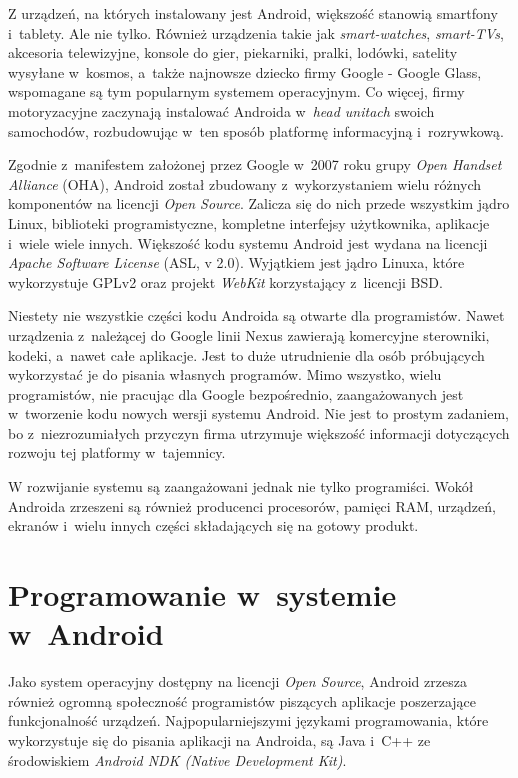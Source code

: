 Z urządzeń, na których instalowany jest Android, większość stanowią smartfony i~tablety. Ale nie tylko. Również urządzenia takie jak \textit{smart-watches}, \textit{smart-TVs}, akcesoria telewizyjne, konsole do gier, piekarniki, pralki, lodówki, satelity wysyłane w~kosmos, a~także najnowsze dziecko firmy Google - Google Glass, wspomagane są tym popularnym systemem operacyjnym. Co więcej, firmy motoryzacyjne zaczynają instalować Androida w~\textit{head unitach} swoich samochodów, rozbudowując w~ten sposób platformę informacyjną i~rozrywkową.

Zgodnie z~manifestem założonej przez Google w~2007 roku grupy \textit{Open Handset Alliance} (OHA), Android został zbudowany z~wykorzystaniem wielu różnych komponentów na licencji \textit{Open Source}. Zalicza się do nich przede wszystkim jądro Linux, biblioteki programistyczne, kompletne interfejsy użytkownika, aplikacje i~wiele wiele innych. Większość kodu systemu Android jest wydana na licencji \textit{Apache Software License} (ASL, v 2.0). Wyjątkiem jest jądro Linuxa, które wykorzystuje GPLv2 oraz projekt \textit{WebKit} korzystający z~licencji BSD. 

Niestety nie wszystkie części kodu Androida są otwarte dla programistów. Nawet urządzenia z~należącej do Google linii Nexus zawierają komercyjne sterowniki, kodeki, a~nawet całe aplikacje. Jest to duże utrudnienie dla osób próbujących wykorzystać je do pisania własnych programów. Mimo wszystko, wielu programistów, nie pracując dla Google bezpośrednio, zaangażowanych jest w~tworzenie kodu nowych wersji systemu Android. Nie jest to prostym zadaniem, bo z~niezrozumiałych przyczyn firma utrzymuje większość informacji dotyczących rozwoju tej platformy w~tajemnicy.

W rozwijanie systemu są zaangażowani jednak nie tylko programiści. Wokół Androida zrzeszeni są również producenci procesorów, pamięci RAM, urządzeń, ekranów i~wielu innych części składających się na gotowy produkt.

\section{Programowanie w~systemie w~Android}
Jako system operacyjny dostępny na licencji \textit{Open Source}, Android zrzesza również ogromną społeczność programistów piszących aplikacje poszerzające funkcjonalność urządzeń. Najpopularniejszymi językami programowania, które wykorzystuje się do pisania aplikacji na Androida, są Java i~C++ ze środowiskiem \textit{Android NDK (Native Development Kit)}. 

